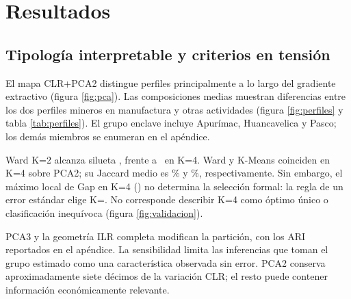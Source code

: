 \section{Resultados}
\subsection{Tipología interpretable y criterios en tensión}
El mapa CLR+PCA2 distingue perfiles principalmente a lo largo del gradiente extractivo (figura \ref{fig:pca}). Las composiciones medias muestran diferencias entre los dos perfiles mineros en manufactura y otras actividades (figura \ref{fig:perfiles} y tabla \ref{tab:perfiles}). El grupo enclave incluye Apurímac, Huancavelica y Pasco; los demás miembros se enumeran en el apéndice.

\begin{table}[htbp]\centering\small
\caption{Participaciones seleccionadas por perfil, en porcentaje}\label{tab:perfiles}
\end{table}

Ward K=2 alcanza silueta \SilMacro, frente a \SilTypology\ en K=4. Ward y K-Means coinciden en K=4 sobre PCA2; su Jaccard medio es \JaccardWard\% y \JaccardKmeans\%, respectivamente. Sin embargo, el máximo local de Gap en K=4 (\GapTypology) no determina la selección formal: la regla de un error estándar elige K=\GapChoice. No corresponde describir K=4 como óptimo único o clasificación inequívoca (figura \ref{fig:validacion}).

PCA3 y la geometría ILR completa modifican la partición, con los ARI reportados en el apéndice. La sensibilidad limita las inferencias que toman el grupo estimado como una característica observada sin error. PCA2 conserva aproximadamente siete décimos de la variación CLR; el resto puede contener información económicamente relevante.

